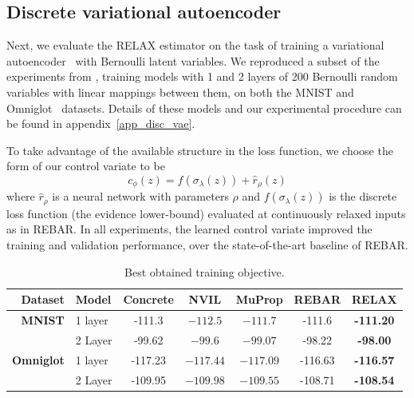 \documentclass{article}
\newcommand{\relaxed}{r}
\newcommand{\RELAX}{{\textnormal{RELAX}}}
\begin{document}
\subsection{Discrete variational autoencoder}
Next, we evaluate the \RELAX{} estimator on the task of training a variational autoencoder~\citep{kingma2013autoencoding, rezende2014stochastic} with Bernoulli latent variables.
We reproduced a subset of the experiments from \citet{tucker2017rebar}, training models with 1 and 2 layers of 200 Bernoulli random variables with linear mappings between them, on both  the MNIST and Omniglot~\citep{lake2015human} datasets.
Details of these models and our experimental procedure can be found in appendix~\ref{app_disc_vae}.


To take advantage of the available structure in the loss function, we choose the form of our control variate to be $$ c_\phi(z) = f(\sigma_\lambda(z))+  \hat{r}_\rho(z) $$ where $\hat{r}_\rho$ is a neural network with parameters $\rho$ and $f(\sigma_\lambda(z))$ is the discrete loss function (the evidence lower-bound) evaluated at continuously relaxed inputs as in REBAR.  
%
In all experiments, the learned control variate improved the training and validation performance, over the state-of-the-art baseline of REBAR. 

\begin{table}[h]
\centering
\begin{tabular}{r l | c c c c c} 
Dataset & Model & Concrete & NVIL & MuProp  & REBAR & RELAX\\\midrule
\textbf{MNIST} & 1 layer  &-111.3 & $-112.5$ & $-111.7$  & -111.6 & \textbf{-111.20} \\ 
               & 2 Layer  &-99.62 & $-99.6$ & $-99.07$   & -98.22 & \textbf{-98.00} \\
\midrule
\textbf{Omniglot} & 1 layer &-117.23 & $-117.44$ & $-117.09$   & -116.63 & \textbf{-116.57} \\ 
                  & 2 Layer &-109.95 & $-109.98$ & $-109.55$  & -108.71 & \textbf{-108.54}
\end{tabular}
\caption{Best obtained training objective.}
\label{tab:vae tr}
\end{table}
\end{document}
